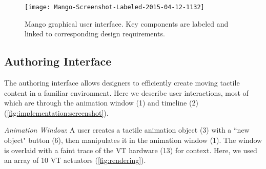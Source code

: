 \begin{figure}[tbh] %
   \centering
   \texttt{[image: Mango-Screenshot-Labeled-2015-04-12-1132]} 
   \caption{Mango graphical user interface. Key components are labeled and linked to corresponding design requirements.}
   \label{fig:implementation:screenshot}
\end{figure}

%
%
\subsection{Authoring Interface}
The authoring interface %
allows designers to efficiently create moving tactile content in a familiar environment.
Here we describe user interactions, %
most of which
are through the animation window (1) and  timeline (2) (\autoref{fig:implementation:screenshot}).
%

\emph{Animation Window}: A user creates a tactile animation object (3) with a ``new object" button (6), then manipulates it in the animation window (1). %
The window is overlaid with a faint trace of the %
VT hardware (13) for %
context. %
Here, we used an array of 10 VT actuators (\autoref{fig:rendering}).


